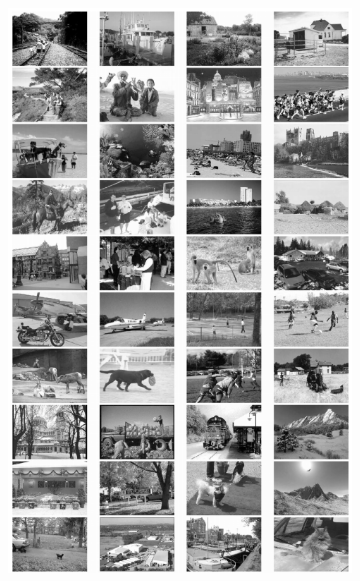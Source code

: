 \begin{figure}[h]
	\centering
	\begin{subfigure}[چند نمونه از تصاویر در محیط باز]{ 0.4\textwidth}
		\includegraphics[scale=0.4]{Imgs/fei2007we_data1.png}
	\end{subfigure}
	\hfill
	\begin{subfigure}[چند نمونه از تصاویر در محیط بسته]{0.4\textwidth}

\end{subfigure}
\end{figure}
